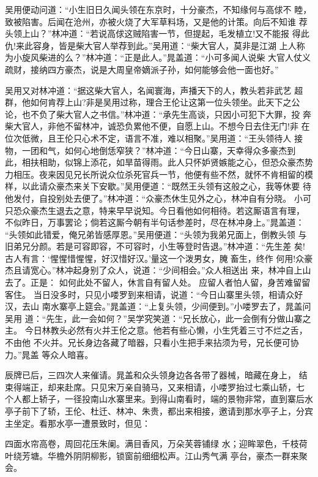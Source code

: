 吴用便动问道：“小生旧日久闻头领在东京时，十分豪杰，不知缘何与高俅不
睦，致被陷害。后闻在沧州，亦被火烧了大军草料场，又是他的计策。向后不知谁
荐头领上山？”林冲道：“若说高俅这贼陷害一节，但提起，毛发植立!又不能报
得此仇!来此容身，皆是柴大官人举荐到此。”吴用道：“柴大官人，莫非是江湖
上人称为小旋风柴进的么？”林冲道：“正是此人。”晁盖道：“小可多闻人说柴
大官人仗义疏财，接纳四方豪杰，说是大周皇帝嫡派子孙，如何能够会他一面也好。”

吴用又对林冲道：“据这柴大官人，名闻寰海，声播天下的人，教头若非武艺
超群，他如何肯荐上山?非是吴用过称，理合王伦让这第一位头领坐。此天下之公
论，也不负了柴大官人之书信。”林冲道：“承先生高谈，只因小可犯下大罪，投
奔柴大官人，非他不留林冲，诚恐负累他不便，自愿上山。不想今日去住无门!非
在位次低微，且王伦只心术不定，语言不准，难以相聚。”吴用道：“王头领待人
接物，一团和气，如何心地倒恁窄狭？”林冲道：“今日山寨，天幸得众多豪杰到
此，相扶相助，似锦上添花，如旱苗得雨。此人只怀妒贤嫉能之心，但恐众豪杰势
力相压。夜来因见兄长所说众位杀死官兵一节，他便有些不然，就怀不肯相留的模
样，以此请众豪杰来关下安歇。”吴用便道：“既然王头领有这般之心，我等休要
待他发付，自投别处去便了。”林冲道：“众豪杰休生见外之心，林冲自有分晓。
小可只恐众豪杰生退去之意，特来早早说知。今日看他如何相待。若这厮语言有理，
不似昨日，万事罢论；倘若这厮今朝有半句话参差时，尽在林冲身上。”晁盖道：
“头领如此错爱，俺兄弟皆感厚恩。”吴用便道：“头领为我弟兄面上，倒教头领
与旧弟兄分颜。若是可容即容，不可容时，小生等登时告退。”林冲道：“先生差
矣!古人有言：‘惺惺惜惺惺，好汉惜好汉。’量这一个泼男女，腌畜生，终作
何用!众豪杰且请宽心。”林冲起身别了众人，说道：“少间相会。”众人相送出
来，林冲自上山去了。正是：
如何此处不留人，休言自有留人处。
应留人者怕人留，身苦难留留客住。
当日没多时，只见小喽罗到来相请，说道：“今日山寨里头领，相请众好汉，去山
南水寨亭上筵会。”晁盖道：“上复头领，少间便到。”小喽罗去了，晁盖问吴用
道：“先生，此一会如何？”吴学究笑道：“兄长放心，此一会倒有分做山寨之主。
今日林教头必然有火并王伦之意。他若有些心懒，小生凭着三寸不烂之舌，不由他
不火并。兄长身边各藏了暗器，只看小生把手来拈须为号，兄长便可协力。”晁盖
等众人暗喜。

辰牌已后，三四次人来催请。晁盖和众头领身边各各带了器械，暗藏在身上，
结束得端正，却来赴席。只见宋万亲自骑马，又来相请，小喽罗抬过七乘山轿，七
个人都上轿子，一径投南山水寨里来。到得山南看时，端的景物非常，直到寨后水
亭子前下了轿，王伦、杜迁、林冲、朱贵，都出来相接，邀请到那水亭子上，分宾
主坐定。看那水亭一遭景致时，但见：

四面水帘高卷，周回花压朱阑。满目香风，万朵芙蓉铺绿
水；迎眸翠色，千枝荷叶绕芳塘。华檐外阴阴柳影，锁窗前细细松声。江山秀气满
亭台，豪杰一群来聚会。

